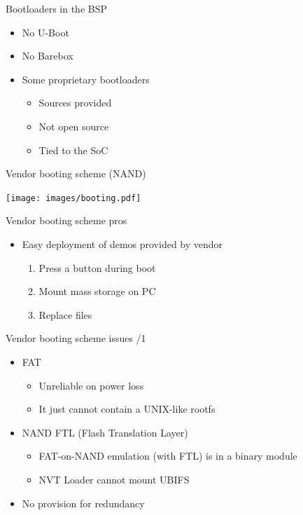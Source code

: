 \documentclass[xetex,table]{beamer}
\begin{document}
\begin{frame}{Bootloaders in the BSP}
  \begin{itemize}
  \item No U-Boot
  \item No Barebox
  \item Some proprietary bootloaders
    \begin{itemize}
    \item Sources provided
    \item Not open source
    \item Tied to the SoC
    \end{itemize}
  \end{itemize}
\end{frame}

\begin{frame}{Vendor booting scheme (NAND)}
  \begin{center}
    \texttt{[image: images/booting.pdf]}
  \end{center}
\end{frame}

\begin{frame}{Vendor booting scheme pros}
  \begin{itemize}
  \item Easy deployment of demos provided by vendor
    \begin{enumerate}
    \item Press  a button during boot
    \item Mount mass storage on PC
    \item Replace files
    \end{enumerate}
  \end{itemize}
\end{frame}

\begin{frame}{Vendor booting scheme issues /1}
  \begin{itemize}
  \item FAT
    \begin{itemize}
    \item Unreliable on power loss
    \item It just cannot contain a UNIX-like rootfs
    \end{itemize}
  \item NAND FTL (Flash Translation Layer)
    \begin{itemize}
    \item FAT-on-NAND emulation (with FTL) is in a binary module
    \item NVT Loader cannot mount UBIFS
  \end{itemize}
  \item No provision for redundancy
  \end{itemize}
\end{frame}
\end{document}
